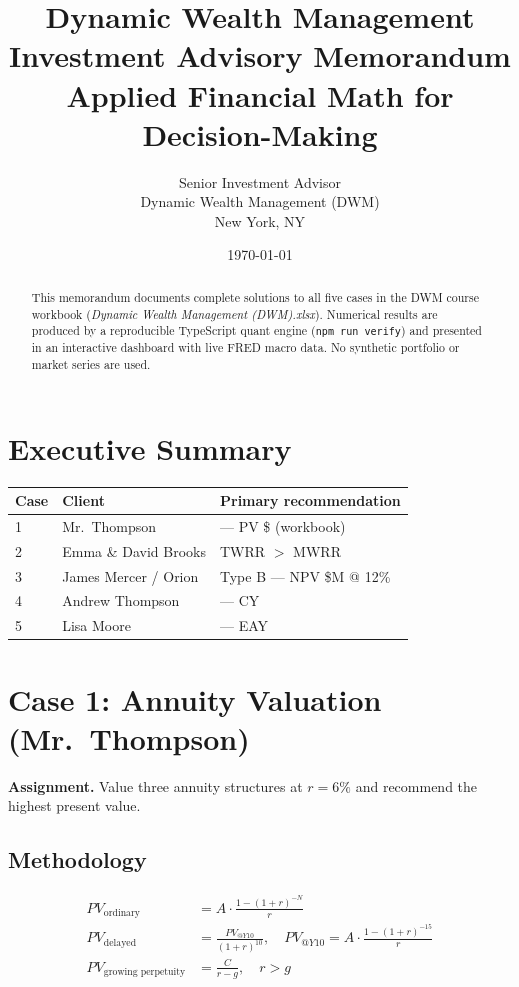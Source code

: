 \documentclass[11pt]{article}
\title{\textbf{Dynamic Wealth Management}\\[0.4em]\large Investment Advisory Memorandum\\[0.2em]\normalsize Applied Financial Math for Decision-Making}
\author{Senior Investment Advisor\\Dynamic Wealth Management (DWM)\\New York, NY}
\date{\today}
\begin{document}
\maketitle

\begin{abstract}
\noindent
This memorandum documents complete solutions to all five cases in the DWM course workbook
(\textit{Dynamic Wealth Management (DWM).xlsx}). Numerical results are produced by a
reproducible TypeScript quant engine (\texttt{npm run verify}) and presented in an
interactive dashboard with live FRED macro data. No synthetic portfolio or market series
are used.
\end{abstract}

\tableofcontents
\newpage

\section{Executive Summary}

\begin{table}[h]
\centering
\small
\begin{tabular}{@{}lll@{}}
\toprule
\textbf{Case} & \textbf{Client} & \textbf{Primary recommendation} \\
\midrule
1 & Mr.\ Thompson & \CaseOneWinner{} --- PV \$\CaseOneC{} (workbook) \\
2 & Emma \& David Brooks & TWRR \CaseTwoTWRR{} $>$ MWRR \CaseTwoMWRR{} \\
3 & James Mercer / Orion & Type B --- NPV \$\CaseThreeBNPV{}M @ 12\% \\
4 & Andrew Thompson & \CaseFourWinner{} --- CY \CaseFourCCY{} \\
5 & Lisa Moore & \CaseFiveWinner{} --- EAY \CaseFiveCEAY{} \\
\bottomrule
\end{tabular}
\end{table}

\section{Case 1: Annuity Valuation (Mr.\ Thompson)}

\textbf{Assignment.} Value three annuity structures at $r=6\%$ and recommend the highest present value.

\subsection{Methodology}
\begin{align}
  PV_{\text{ordinary}} &= A \cdot \frac{1-(1+r)^{-N}}{r} \\
  PV_{\text{delayed}} &= \frac{PV_{@Y10}}{(1+r)^{10}}, \quad PV_{@Y10} = A \cdot \frac{1-(1+r)^{-15}}{r} \\
  PV_{\text{growing perpetuity}} &= \frac{C}{r-g}, \quad r > g
\end{align}
\end{document}
